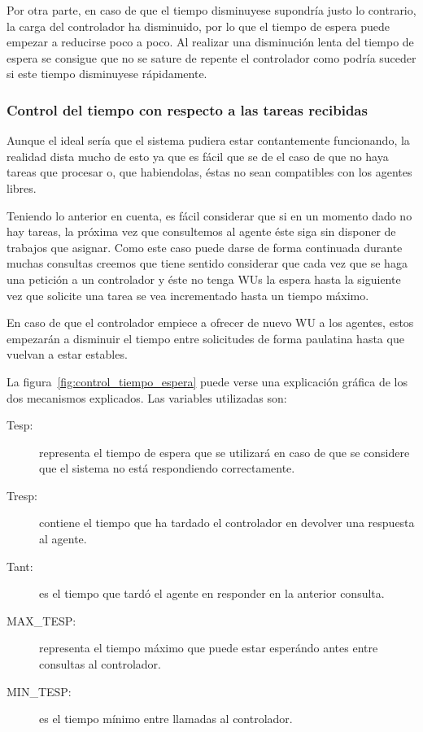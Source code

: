 Por otra parte, en caso de que el tiempo disminuyese supondría justo lo contrario, la carga del controlador ha disminuido, por lo que el tiempo de espera puede empezar a reducirse poco a poco. Al realizar una disminución lenta del tiempo de espera se consigue que no se sature de repente el controlador como podría suceder si este tiempo disminuyese rápidamente.

\subsubsection{Control del tiempo con respecto a las tareas recibidas}

Aunque el ideal sería que el sistema pudiera estar contantemente funcionando, la realidad dista mucho de esto ya que es fácil que se de el caso de que no haya tareas que procesar o, que habiendolas, éstas no sean compatibles con los agentes libres.

Teniendo lo anterior en cuenta, es fácil considerar que si en un momento dado no hay tareas, la próxima vez que consultemos al agente éste siga sin disponer de trabajos que asignar. Como este caso puede darse de forma continuada durante muchas consultas creemos que tiene sentido considerar que cada vez que se haga una petición a un controlador y éste no tenga WUs la espera hasta la siguiente vez que solicite una tarea se vea incrementado hasta un tiempo máximo. 

En caso de que el controlador empiece a ofrecer de nuevo WU a los agentes, estos empezarán a disminuir el tiempo entre solicitudes de forma paulatina hasta que vuelvan a estar estables.

La figura~\ref{fig:control_tiempo_espera} puede verse una explicación gráfica de los dos mecanismos explicados. Las variables utilizadas son:
\begin{description}
	\item[Tesp:] representa el tiempo de espera que se utilizará en caso de que se considere que el sistema no está respondiendo correctamente.
	
	\item[Tresp:] contiene el tiempo que ha tardado el controlador en devolver una respuesta al agente.
	
	\item[Tant:] es el tiempo que tardó el agente en responder en la anterior consulta.
	
	\item[MAX\_TESP:] representa el tiempo máximo que puede estar esperándo antes entre consultas al controlador.
	
	\item[MIN\_TESP:] es el tiempo mínimo entre llamadas al controlador.
\end{description}

